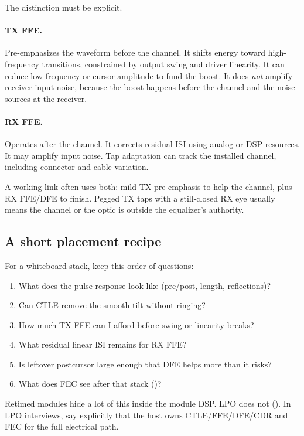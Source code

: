The distinction must be explicit.

\paragraph{TX FFE.}
Pre-emphasizes the waveform before the channel. It shifts energy toward
high-frequency transitions, constrained by output swing and driver linearity.
It can reduce low-frequency or cursor amplitude to fund the boost. It does
\emph{not} amplify receiver input noise, because the boost happens before the
channel and the noise sources at the receiver.

\paragraph{RX FFE.}
Operates after the channel. It corrects residual ISI using analog or DSP
resources. It may amplify input noise. Tap adaptation can track the installed
channel, including connector and cable variation.

A working link often uses both: mild TX pre-emphasis to help the channel, plus
RX FFE/DFE to finish. Pegged TX taps with a still-closed RX eye usually means
the channel or the optic is outside the equalizer's authority.

\subsection{A short placement recipe}
\label{sec:eq-stack-recipe}

For a whiteboard stack, keep this order of questions:

\begin{enumerate}
\item What does the pulse response look like (pre/post, length, reflections)?
\item Can CTLE remove the smooth tilt without ringing?
\item How much TX FFE can I afford before swing or linearity breaks?
\item What residual linear ISI remains for RX FFE?
\item Is leftover postcursor large enough that DFE helps more than it risks?
\item What does FEC see after that stack ()?
\end{enumerate}

Retimed modules hide a lot of this inside the module DSP. LPO does not
(). In LPO interviews, say explicitly that the
host owns CTLE/FFE/DFE/CDR and FEC for the full electrical path.

